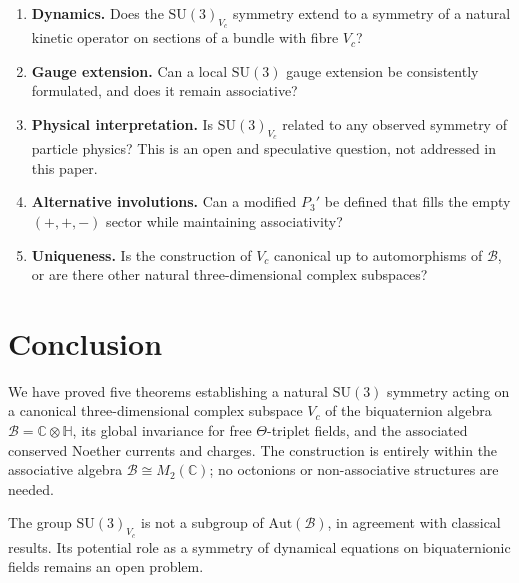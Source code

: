 \documentclass[12pt,a4paper]{article}
\theoremstyle{remark}
\newcommand{\B}{\mathcal{B}}          %
\newcommand{\C}{\mathbb{C}}
\newcommand{\H}{\mathbb{H}}
\begin{document}
\begin{enumerate}
  \item \textbf{Dynamics.}  Does the $\mathrm{SU}(3)_{V_c}$ symmetry extend
    to a symmetry of a natural kinetic operator on sections of a bundle with
    fibre $V_c$?

  \item \textbf{Gauge extension.}  Can a local $\mathrm{SU}(3)$ gauge
    extension be consistently formulated, and does it remain associative?

  \item \textbf{Physical interpretation.}  Is $\mathrm{SU}(3)_{V_c}$ related
    to any observed symmetry of particle physics?  This is an open and
    speculative question, not addressed in this paper.

  \item \textbf{Alternative involutions.}  Can a modified $P_3'$ be defined
    that fills the empty $(+,+,-)$ sector while maintaining associativity?

  \item \textbf{Uniqueness.}  Is the construction of $V_c$ canonical up to
    automorphisms of $\B$, or are there other natural three-dimensional
    complex subspaces?
\end{enumerate}

\section{Conclusion}
\label{sec:conclusion}

We have proved five theorems establishing a natural $\mathrm{SU}(3)$
symmetry acting on a canonical three-dimensional complex subspace $V_c$ of
the biquaternion algebra $\B = \C\otimes\H$, its global invariance for free
$\Theta$-triplet fields, and the associated conserved Noether currents and
charges.  The construction is entirely within the associative algebra
$\B\cong M_2(\C)$; no octonions or non-associative structures are needed.

The group $\mathrm{SU}(3)_{V_c}$ is not a subgroup of $\mathrm{Aut}(\B)$, in
agreement with classical results.  Its potential role as a symmetry of
dynamical equations on biquaternionic fields remains an open problem.
\end{document}
